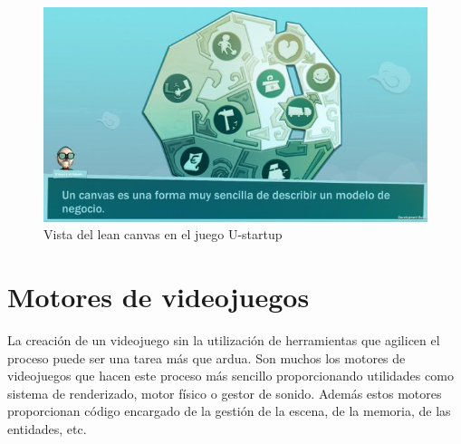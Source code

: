\begin{description}
\begin{figure}
\begin{center}
\includegraphics[scale=0.6]{imagenes/ustartup01.jpg}
\caption{Vista del lean canvas en el juego U-startup}
\label{ustartup01}
\end{center}
\end{figure}

\end{description}


\section{Motores de videojuegos}

La creación de un videojuego sin la utilización de herramientas que agilicen el proceso puede ser una tarea más que ardua. Son muchos los motores de videojuegos que hacen este proceso más sencillo proporcionando utilidades como sistema de renderizado, motor físico o gestor de sonido. Además estos motores proporcionan código encargado de la gestión de la escena, de la memoria, de las entidades, etc.